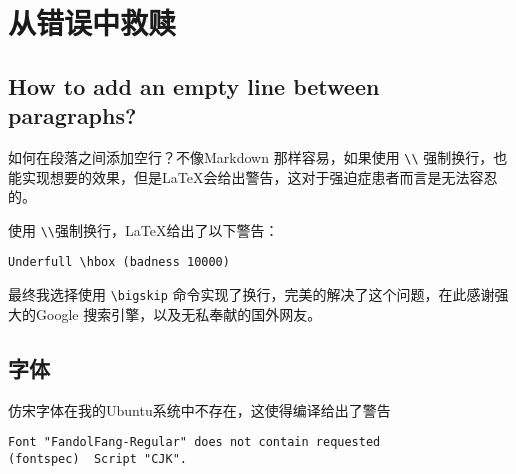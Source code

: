 \chapter{从错误中救赎}

\section[换行]{How to add an empty line between paragraphs?}

如何在段落之间添加空行？不像Markdown 那样容易，如果使用 \verb`\\` 强制换行，也能实现想要的效果，但是\LaTeX 会给出警告，这对于强迫症患者而言是无法容忍的。

使用 \verb`\\`强制换行，\LaTeX 给出了以下警告：
\begin{lstlisting}
Underfull \hbox (badness 10000)
\end{lstlisting}

最终我选择使用 \verb|\bigskip|  命令实现了换行，完美的解决了这个问题，在此感谢强大的Google 搜索引擎，以及无私奉献的国外网友。
\section{字体}

仿宋字体在我的Ubuntu系统中不存在，这使得编译给出了警告
\begin{lstlisting}
Font "FandolFang-Regular" does not contain requested
(fontspec)	Script "CJK".
\end{lstlisting}